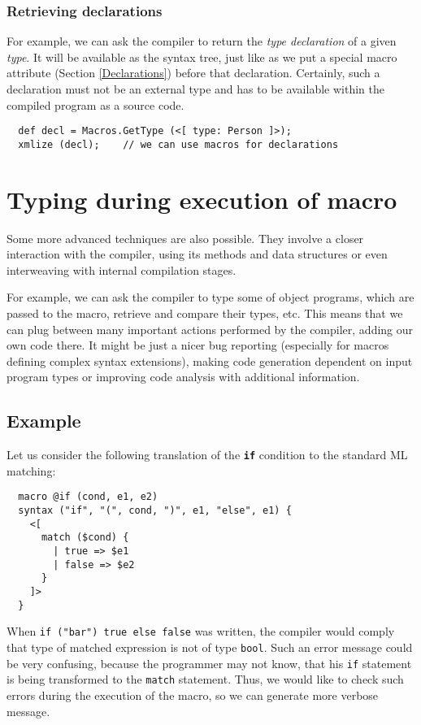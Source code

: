 \documentclass{llncs}
\newcommand{\kw}[1]{{\tt \bf #1}}
\begin{document}
\subsubsection{Retrieving declarations}
For example, we can ask the compiler to return the \emph{type declaration} 
of a given \emph{type}. It will be available as the syntax tree, just like 
as we put a special macro attribute (Section \ref{Declarations}) before that declaration.
Certainly, such a declaration must not be an external type 
and has to be available within the compiled program as a source code.

\begin{verbatim}
  def decl = Macros.GetType (<[ type: Person ]>);
  xmlize (decl);    // we can use macros for declarations
\end{verbatim}

\section{Typing during execution of macro}
Some more advanced techniques are also possible. They involve a closer
interaction with the compiler, using its methods and data structures
or even interweaving with internal compilation stages.

For example, we can ask the compiler to type some of object programs,
which are passed to the macro, retrieve and compare their types, etc.
This means that we can plug between many important actions performed by 
the compiler, adding our own code there. It might be just a nicer 
bug reporting (especially for macros defining complex syntax extensions), 
making code generation dependent on input program types or improving
code analysis with additional information.

\subsection{Example}
Let us consider the following translation of the \kw{if} condition to the standard
ML matching:

\begin{verbatim}
  macro @if (cond, e1, e2)
  syntax ("if", "(", cond, ")", e1, "else", e1) {
    <[ 
      match ($cond) {
        | true => $e1
        | false => $e2
      }       
    ]>
  }
\end{verbatim} %

When \verb,if ("bar") true else false, was written, the compiler would comply
that type of matched expression is not of type \verb,bool,. Such an error 
message could be very confusing, because the programmer may not know, that his 
\verb,if, statement is being transformed to the \verb,match, statement. Thus, 
we would like to check such errors during the execution of the macro, so we can
generate more verbose message.
\end{document}
